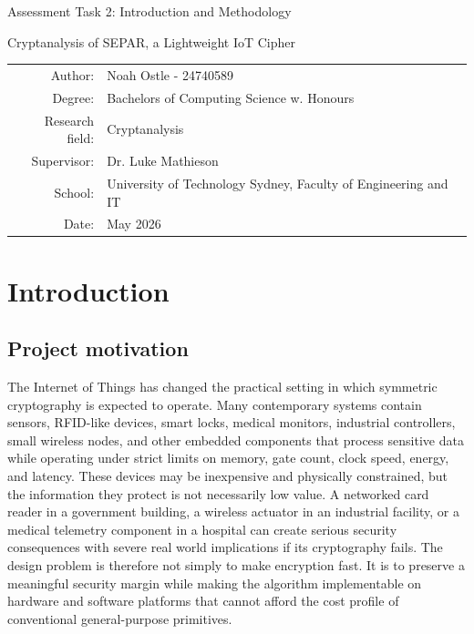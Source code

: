 \documentclass[11pt]{article}
\begin{document}
\begin{titlepage}
\centering
\vspace*{2cm}
{\Large Assessment Task 2: Introduction and Methodology \par}
\vspace{1.2cm}
{\huge Cryptanalysis of SEPAR, a Lightweight IoT Cipher\par}
\vspace{2cm}
\begin{tabular}{rl}
Author: & Noah Ostle - 24740589 \\
Degree: & Bachelors of Computing Science w. Honours \\
Research field: & Cryptanalysis \\
Supervisor: & Dr. Luke Mathieson \\
School: & University of Technology Sydney, Faculty of Engineering and IT \\
Date: & May 2026 \\
\end{tabular}
\vfill
\end{titlepage}

\tableofcontents
\newpage

\section{Introduction}

\subsection{Project motivation}

The Internet of Things has changed the practical setting in which symmetric cryptography is expected to operate. Many contemporary systems contain sensors, RFID-like devices, smart locks, medical monitors, industrial controllers, small wireless nodes, and other embedded components that process sensitive data while operating under strict limits on memory, gate count, clock speed, energy, and latency. These devices may be inexpensive and physically constrained, but the information they protect is not necessarily low value. A networked card reader in a government building, a wireless actuator in an industrial facility, or a medical telemetry component in a hospital can create serious security consequences with severe real world implications if its cryptography fails. The design problem is therefore not simply to make encryption fast. It is to preserve a meaningful security margin while making the algorithm implementable on hardware and software platforms that cannot afford the cost profile of conventional general-purpose primitives.\\
\end{document}
